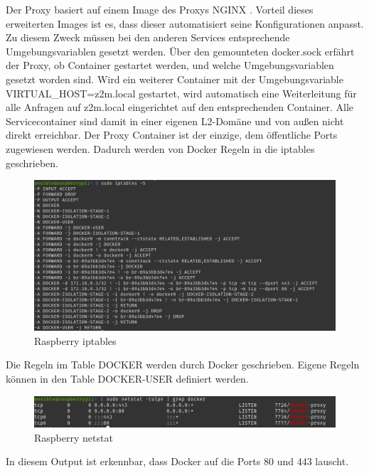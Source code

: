 Der Proxy basiert auf einem Image des Proxys NGINX \cite{nginxpm}. Vorteil dieses erweiterten Images ist es,
dass dieser automatisiert seine Konfigurationen anpasst. Zu diesem Zweck müssen bei den anderen Services entsprechende Umgebungsvariablen gesetzt werden. Über den gemounteten
\grqq docker.sock \grqq{} erfährt der Proxy, ob Container gestartet werden, und welche Umgebungsvariablen gesetzt worden sind. Wird ein weiterer Container mit der Umgebungsvariable 
\grqq VIRTUAL\_HOST=z2m.local \grqq{} gestartet, wird automatisch eine Weiterleitung für alle Anfragen auf \grqq z2m.local\grqq{} eingerichtet auf den entsprechenden Container.
Alle Servicecontainer sind damit in einer eigenen L2-Domäne und von außen nicht direkt erreichbar. Der Proxy Container ist der einzige, dem öffentliche Ports zugewiesen werden.
Dadurch werden von Docker Regeln in die \grqq iptables \grqq{} geschrieben. 

\begin{figure}[H]
  \centering
  \includegraphics[width=1\textwidth]{media/rasp-iptables.png}
  \caption{Raspberry iptables}
\end{figure}

Die Regeln im Table \grqq DOCKER \grqq{} werden durch Docker geschrieben. Eigene Regeln können in den Table 
\grqq DOCKER-USER \grqq{} definiert werden.

\begin{figure}[H]
  \centering
  \includegraphics[width=1\textwidth]{media/rasp-netstat.png}
  \caption{Raspberry netstat}
\end{figure}

In diesem Output ist erkennbar, dass Docker auf die Ports 80 und 443 lauscht.

